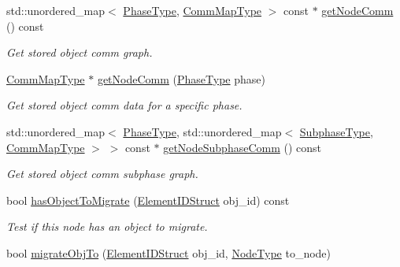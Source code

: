 \begin{DoxyCompactItemize}
std\+::unordered\+\_\+map$<$ \hyperlink{namespacevt_a46ce6733d5cdbd735d561b7b4029f6d7}{Phase\+Type}, \hyperlink{namespacevt_1_1vrt_1_1collection_1_1balance_a01ee1fb0ae2da1d2ab7fdca3be9ae351}{Comm\+Map\+Type} $>$ const  $\ast$ \hyperlink{structvt_1_1vrt_1_1collection_1_1balance_1_1_node_l_b_data_a01ac3980585c93769570fd4e76ea9218}{get\+Node\+Comm} () const
\begin{DoxyCompactList}\small\item\em Get stored object comm graph. \end{DoxyCompactList}\item 
\hyperlink{namespacevt_1_1vrt_1_1collection_1_1balance_a01ee1fb0ae2da1d2ab7fdca3be9ae351}{Comm\+Map\+Type} $\ast$ \hyperlink{structvt_1_1vrt_1_1collection_1_1balance_1_1_node_l_b_data_a6805869aeb1d424289ddb2b6be653595}{get\+Node\+Comm} (\hyperlink{namespacevt_a46ce6733d5cdbd735d561b7b4029f6d7}{Phase\+Type} phase)
\begin{DoxyCompactList}\small\item\em Get stored object comm data for a specific phase. \end{DoxyCompactList}\item 
std\+::unordered\+\_\+map$<$ \hyperlink{namespacevt_a46ce6733d5cdbd735d561b7b4029f6d7}{Phase\+Type}, std\+::unordered\+\_\+map$<$ \hyperlink{namespacevt_ae78cbfdf1e57470e33eedb074f2beeba}{Subphase\+Type}, \hyperlink{namespacevt_1_1vrt_1_1collection_1_1balance_a01ee1fb0ae2da1d2ab7fdca3be9ae351}{Comm\+Map\+Type} $>$ $>$ const  $\ast$ \hyperlink{structvt_1_1vrt_1_1collection_1_1balance_1_1_node_l_b_data_a783e8620fff1016d7073a3747379127f}{get\+Node\+Subphase\+Comm} () const
\begin{DoxyCompactList}\small\item\em Get stored object comm subphase graph. \end{DoxyCompactList}\item 
bool \hyperlink{structvt_1_1vrt_1_1collection_1_1balance_1_1_node_l_b_data_af025247a42d9b3ff6ba476714aad42fa}{has\+Object\+To\+Migrate} (\hyperlink{namespacevt_1_1vrt_1_1collection_1_1balance_a9f5b53fafb270212279a4757d2c4cd28}{Element\+I\+D\+Struct} obj\+\_\+id) const
\begin{DoxyCompactList}\small\item\em Test if this node has an object to migrate. \end{DoxyCompactList}\item 
bool \hyperlink{structvt_1_1vrt_1_1collection_1_1balance_1_1_node_l_b_data_a66619f696c49ce53d005f4b9ebbf12a2}{migrate\+Obj\+To} (\hyperlink{namespacevt_1_1vrt_1_1collection_1_1balance_a9f5b53fafb270212279a4757d2c4cd28}{Element\+I\+D\+Struct} obj\+\_\+id, \hyperlink{namespacevt_a866da9d0efc19c0a1ce79e9e492f47e2}{Node\+Type} to\+\_\+node)

\end{DoxyCompactItemize}
